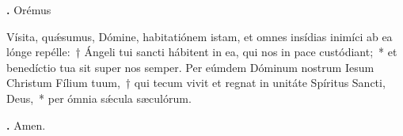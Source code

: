\textbf{\Vbar.} Orémus

Vísita, qu\'{\ae}sumus, Dómine, habitatiónem istam, et omnes insídias inimíci ab ea lónge repélle:~†  Ángeli tui sancti hábitent in ea, qui nos in pace custódiant;~* et benedíctio tua sit super nos semper.
Per eúmdem Dóminum nostrum Iesum Christum Fílium tuum,~† qui tecum vivit et regnat in unitáte Spíritus Sancti, Deus,~* per ómnia s\'{\ae}cula sæculórum.

\textbf{\Rbar.} Amen.

